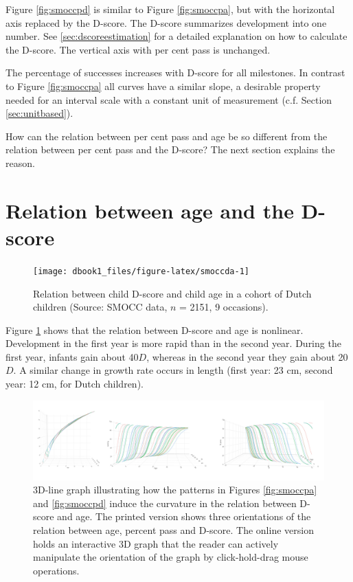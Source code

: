 \documentclass[
]{book}
\begin{document}
Figure \ref{fig:smoccpd} is similar to Figure \ref{fig:smoccpa}, but with the horizontal axis replaced by the D-score. The D-score summarizes development into one number. See \ref{sec:dscoreestimation} for a detailed explanation on how to calculate the D-score. The vertical axis with per cent pass is unchanged.

The percentage of successes increases with D-score for all milestones. In contrast to Figure \ref{fig:smoccpa} all curves have a similar slope, a desirable property needed for an interval scale with a constant unit of measurement (c.f. Section \ref{sec:unitbased}).

How can the relation between per cent pass and age be so different from the relation between per cent pass and the D-score? The next section explains the reason.

\hypertarget{sec:aged}{%
\section{Relation between age and the D-score}\label{sec:aged}}

\begin{figure}

{\centering \texttt{[image: dbook1\_files/figure-latex/smoccda-1]} 

}

\caption{Relation between child D-score and child age in a cohort of Dutch children (Source: SMOCC data, \(n\) = 2151, 9 occasions).}\label{fig:smoccda}
\end{figure}



Figure \ref{fig:smoccda} shows that the relation between D-score and age is nonlinear. Development in the first year is more rapid than in the second year. During the first year, infants gain about 40\(D\), whereas in the second year they gain about 20\(D\). A similar change in growth rate occurs in length (first year: 23 cm, second year: 12 cm, for Dutch children).

\begin{figure}

{\centering \includegraphics[width=1\linewidth]{fig/scenes} 

}

\caption{3D-line graph illustrating how the patterns in Figures \ref{fig:smoccpa} and \ref{fig:smoccpd} induce the curvature in the relation between D-score and age. The printed version shows three orientations of the relation between age, percent pass and D-score. The online version holds an interactive 3D graph that the reader can actively manipulate the orientation of the graph by click-hold-drag mouse operations.}\label{fig:smoccdap}
\end{figure}
\end{document}
